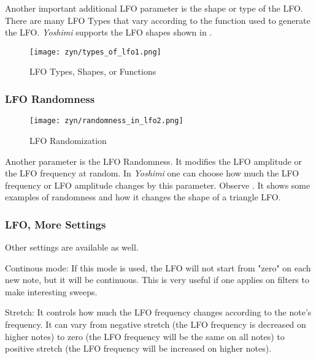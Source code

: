    Another important additional LFO parameter is the shape or type of the
   LFO. There are many LFO Types that vary according to the function used to
   generate the LFO. \textsl{Yoshimi} supports the LFO shapes shown in
   .

\begin{figure}[H]
   \centering 
   \texttt{[image: zyn/types\_of\_lfo1.png]}
   \caption[LFO Functions]{LFO Types, Shapes, or Functions}
   \label{fig:types_of_lfo}
\end{figure}

\subsubsection{LFO Randomness}
\label{subsubsec:lfo_randomness}

\begin{figure}[H]
   \centering 
   \texttt{[image: zyn/randomness\_in\_lfo2.png]}
   \caption[LFO Randomization]{LFO Randomization}
   \label{fig:randomness_in_lfo}
\end{figure}

   Another parameter is the LFO Randomness. It modifies the LFO amplitude or
   the LFO frequency at random. In \textsl{Yoshimi}
   one can choose how much the LFO
   frequency or LFO amplitude changes by this parameter.
   Observe .
   It shows some examples of randomness and how it changes the shape of a
   triangle LFO.

\subsubsection{LFO, More Settings}
\label{subsubsec:lfo_more_settings}

   Other settings are available as well.

   Continous mode: If this mode is used, the LFO will not start from "zero" on
   each new note, but it will be continuous. This is very useful if one
   applies on filters to make interesting sweeps.

   Stretch: It controls how much the LFO frequency changes according to the
   note’s frequency. It can vary from negative stretch (the LFO frequency is
   decreased on higher notes) to zero (the LFO frequency will be the same
   on all notes) to positive stretch (the LFO frequency will be
   increased on higher notes).

